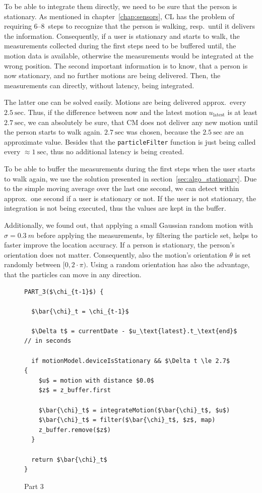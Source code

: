 To be able to integrate them directly, we need to be sure that the person is stationary. As mentioned in chapter~\ref{chap:sensors}, \acs{CL} has the problem of requiring 6--8~steps to recognize that the person is walking, resp.\ until it delivers the information. Consequently, if a user is stationary and starts to walk, the measurements collected during the first steps need to be buffered until, the motion data is available, otherwise the measurements would be integrated at the wrong position. The second important information is to know, that a person is now stationary, and no further motions are being delivered. Then, the measurements can directly, without latency, being integrated.

The latter one can be solved easily. Motions are being delivered approx.\ every $2.5~\text{sec}$. Thus, if the difference between now and the latest motion $u_\text{latest}$ is at least $2.7~\text{sec}$, we can absolutely be sure, that \acs{CM} does not deliver any new motion until the person starts to walk again. $2.7~\text{sec}$ was chosen, because the $2.5~\text{sec}$ are an approximate value. Besides that the \texttt{particleFilter} function is just being called every $\approx 1~\text{sec}$, thus no additional latency is being created.

To be able to buffer the measurements during the first steps when the user starts to walk again, we use the solution presented in section~\ref{sec:algo_stationary}. Due to the simple moving average over the last one second, we can detect within approx.\ one second if a user is stationary or not. If the user is not stationary, the integration is not being executed, thus the values are kept in the buffer.

Additionally, we found out, that applying a small Gaussian random motion with $\sigma = 0.3~m$ before applying the measurements, by filtering the particle set, helps to faster improve the location accuracy. If a person is stationary, the person's orientation does not matter. Consequently, also the motion's orientation $\theta$ is set randomly between $[0, 2 \cdot \pi)$. Using a random orientation has also the advantage, that the particles can move in any direction.

\begin{figure}
\begin{lstlisting}[mathescape]
PART_3($\chi_{t-1}$) {

  $\bar{\chi}_t = \chi_{t-1}$
  
  $\Delta t$ = currentDate - $u_\text{latest}.t_\text{end}$ // in seconds

  if motionModel.deviceIsStationary && $\Delta t \le 2.7$  {
    $u$ = motion with distance $0.0$
    $z$ = z_buffer.first
    
    $\bar{\chi}_t$ = integrateMotion($\bar{\chi}_t$, $u$)
    $\bar{\chi}_t$ = filter($\bar{\chi}_t$, $z$, map)
    z_buffer.remove($z$)
  }
  
  return $\bar{\chi}_t$
}
\end{lstlisting}
\caption{Part 3}
\label{lst:algo_pf_3}
\end{figure}



